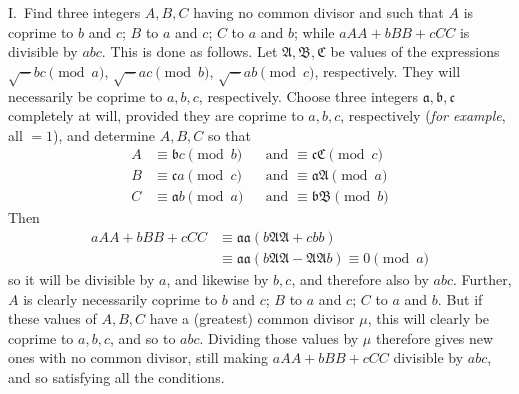I.\ Find three integers \(A,B,C\) having no common divisor and such
that \(A\) is coprime to \(b\) and \(c\); \(B\) to \(a\)
and \(c\); \(C\) to \(a\) and \(b\); while \(aAA+bBB+cCC\) is
divisible by \(abc\). This is done as follows. Let \(\mathfrak A,\mathfrak B,\mathfrak C\) be values
of the expressions \(\surd-bc\pmod a\), \(\surd-ac\pmod b\), \(\surd-ab\pmod c\), respectively. They
will necessarily be coprime to \(a,b,c\), respectively. Choose three
integers \(\mathfrak a,\mathfrak b,\mathfrak c\) completely at will, provided they are coprime to
\(a,b,c\), respectively (\textit{for example}, all \(=1\)), and determine
\(A,B,C\) so that
\[
\begin{aligned}
A&\equiv\mathfrak b c\pmod b&&\text{and }\equiv\mathfrak c\mathfrak C\pmod c\\
B&\equiv\mathfrak c a\pmod c&&\text{and }\equiv\mathfrak a\mathfrak A\pmod a\\
C&\equiv\mathfrak a b\pmod a&&\text{and }\equiv\mathfrak b\mathfrak B\pmod b
\end{aligned}
\]
Then
\[
\begin{aligned}
aAA+bBB+cCC&\equiv\mathfrak a\mathfrak a(b\mathfrak A\mathfrak A+cbb)\\
&\equiv\mathfrak a\mathfrak a(b\mathfrak A\mathfrak A-\mathfrak A\mathfrak A b)\equiv0\pmod a
\end{aligned}
\]
so it will be divisible by \(a\), and likewise by \(b,c\), and
therefore also by \(abc\). Further, \(A\) is clearly necessarily
coprime to \(b\) and \(c\); \(B\) to \(a\) and \(c\);
\(C\) to \(a\) and \(b\). But if these values of \(A,B,C\) have
a (greatest) common divisor \(\mu\), this will clearly be coprime
to \(a,b,c\), and so to \(abc\). Dividing those values by \(\mu\)
therefore gives new ones with no common divisor, still making
\(aAA+bBB+cCC\) divisible by \(abc\), and so satisfying all the conditions.

